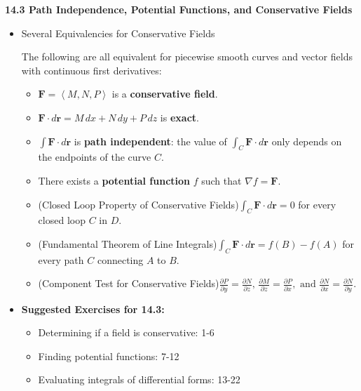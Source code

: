 \documentclass[12pt]{article}
\newcommand{\ds}{\displaystyle}
\renewcommand{\vec}[1]{\mathbf{#1}}
\newcommand{\<}{\left<}
\renewcommand{\>}{\right>}
\begin{document}
  \newpage
  
  \centerline{\bf 14.3 Path Independence, Potential Functions, and Conservative Fields}
  
  \begin{itemize}
    
  \item Several Equivalencies for Conservative Fields
    
    The following are all equivalent for piecewise smooth curves and vector fields with continuous first derivatives:
    \begin{itemize}
      \item $\vec{F}=\<M,N,P\>$ is a \textbf{conservative field}.
      \item $\vec{F}\cdot d\vec{r} = M\,dx+N\,dy+P\,dz$ is \textbf{exact}.
      \item $\int\vec{F}\cdot d\vec{r}$ is \textbf{path independent}: the value of $\int_C\vec{F}\cdot d\vec{r}$ only depends on the endpoints of the curve $C$.
      \item There exists a \textbf{potential function} $f$ such that $\nabla f = \vec{F}$.
      \item (Closed Loop Property of Conservative Fields)\newline $\ds \int_C \vec{F} \cdot d\vec{r} = 0$ for every closed loop $C$ in $D$. 
      \item (Fundamental Theorem of Line Integrals)\newline $\ds \int_C \vec{F} \cdot d\vec{r} = f(B)-f(A)$ for every path $C$ connecting $A$ to $B$.
      \item (Component Test for Conservative Fields)\newline $\ds \frac{\partial P}{\partial y}=\frac{\partial N}{\partial z},\,\frac{\partial M}{\partial z}=\frac{\partial P}{\partial x},\text{ and }\frac{\partial N}{\partial x}=\frac{\partial N}{\partial y}$. 
    \end{itemize}

  \item \textbf{Suggested Exercises for 14.3:}
  
    \begin{itemize}
    \item Determining if a field is conservative: 1-6
    \item Finding potential functions: 7-12
    \item Evaluating integrals of differential forms: 13-22
    \end{itemize}
    
  \end{itemize}
  
\end{document}
